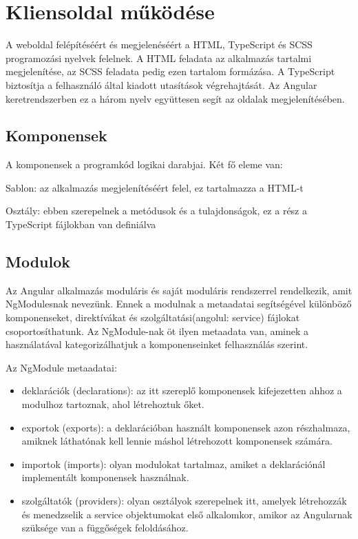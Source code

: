 \section{Kliensoldal működése}
\label{section:client}
A weboldal felépítéséért és megjelenéséért a HTML, TypeScript és SCSS programozási nyelvek felelnek. A HTML feladata az alkalmazás tartalmi megjelenítése, az SCSS feladata pedig ezen tartalom formázása. A TypeScript biztosítja a felhasználó által kiadott utasítások végrehajtását. Az Angular keretrendszerben ez a három nyelv együttesen segít az oldalak megjelenítésében.

\subsection{Komponensek}
A komponensek\cite{components} a programkód logikai darabjai. Két fő eleme van:
\begin{compactenum}
	\item Sablon: az alkalmazás megjelenítéséért felel, ez tartalmazza a HTML-t
	\item Osztály: ebben szerepelnek a  metódusok és a tulajdonságok, ez a rész a TypeScript fájlokban van definiálva
\end{compactenum}

\subsection{Modulok}
Az Angular alkalmazás moduláris és saját moduláris rendszerrel rendelkezik, amit NgModulesnak\cite{ngmodules} nevezünk. Ennek a modulnak a metaadatai segítségével különböző komponenseket, direktívákat és szolgáltatási(angolul: service) fájlokat csoportosíthatunk. Az NgModule-nak öt ilyen metaadata van, aminek a használatával kategorizálhatjuk a komponenseinket felhasználás szerint.

Az NgModule metaadatai:

\begin{itemize}
	\item deklarációk (declarations): az itt szereplő komponensek kifejezetten ahhoz a modulhoz tartoznak, ahol létrehoztuk őket.
	\item exportok (exports): a deklarációban használt komponensek azon részhalmaza, amiknek láthatónak kell lennie máshol létrehozott komponensek számára.
	\item importok (imports): olyan modulokat tartalmaz, amiket a deklarációnál implementált komponensek használnak.
	\item szolgáltatók (providers): olyan osztályok szerepelnek itt, amelyek létrehozzák és menedzselik a service objektumokat első alkalomkor, amikor az Angularnak szüksége van a függőségek feloldásához.
\end{itemize}

